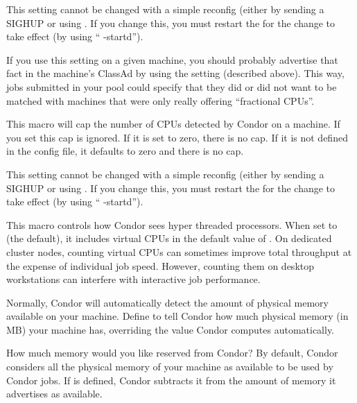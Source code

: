 \begin{description}
  \Note This setting cannot be changed with a simple reconfig (either
  by sending a SIGHUP or using .
  If you change this, you must restart the  for the
  change to take effect (by using `` -startd'').

  \Note If you use this setting on a given machine, you should
  probably advertise that fact in the machine's ClassAd by using the
   setting (described above).
  This way, jobs submitted in your pool could specify that they did or
  did not want to be matched with machines that were only really
  offering ``fractional CPUs''.

\item[\Macro{MAX\_NUM\_CPUS}] \label{param:MaxNumCpus}
  This macro will cap the number of CPUs detected by Condor on a machine.
  If you set  this cap is ignored.
  If it is set to zero, there is no cap. 
  If it is not defined in the config file, it defaults to zero and there is
  no cap. 

  \Note This setting cannot be changed with a simple reconfig (either
  by sending a SIGHUP or using .
  If you change this, you must restart the  for the
  change to take effect (by using `` -startd'').

\item[\Macro{COUNT\_HYPERTHREAD\_CPUS}] \label{param:CountHyperthreadCpus}
  This macro controls how Condor sees hyper threaded
  processors. When set to  (the default), it includes virtual CPUs in
  the default value of . On dedicated cluster nodes, 
  counting virtual CPUs can sometimes improve total throughput at the expense 
  of individual job speed. However, counting them on desktop workstations can
  interfere with interactive job performance.

\item[\Macro{MEMORY}] \label{param:Memory}
  Normally, Condor will automatically detect the amount of physical
  memory available on your machine.  Define  to tell
  Condor how much physical memory (in MB) your machine has, overriding
  the value Condor computes automatically.

\item[\Macro{RESERVED\_MEMORY}] \label{param:ReservedMemory}
  How much memory would you like reserved from Condor?  By default,
  Condor considers all the physical memory of your machine as
  available to be used by Condor jobs.  If  is
  defined, Condor subtracts it from the amount of memory it advertises
  as available.


\end{description}
